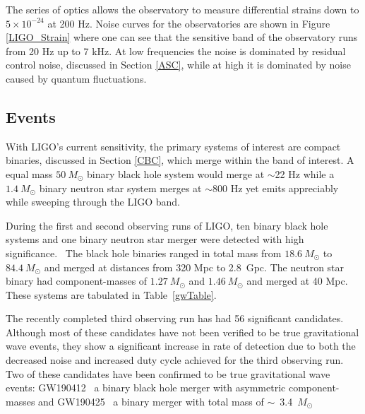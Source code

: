 \documentclass [12pt, proquest]{uwthesis}[2019]
\begin{document}
The series of optics allows the observatory to measure differential strains down to $5\times10^{-24}$ at 200 Hz.  Noise curves for the observatories are shown in Figure \ref{LIGO_Strain} where one can see that the sensitive band of the observatory runs from 20 Hz up to 7 kHz. At low frequencies the noise is dominated by residual control noise, discussed in Section \ref{ASC}, while at high it is dominated by noise caused by quantum fluctuations. ~\cite{Squeeze}



\subsection{Events}

With LIGO's current sensitivity, the primary systems of interest are compact binaries, discussed in Section \ref{CBC}, which merge within the band of interest. A equal mass $50\ M_\odot$ binary black hole system would merge at $\sim$22 Hz while a $1.4\ M_\odot$ binary neutron star system merges at $\sim$800 Hz yet emits appreciably while sweeping through the LIGO band.

During the first and second observing runs of LIGO, ten binary black hole systems and one binary neutron star merger were detected with high significance.~\cite{GWTC} The black hole binaries ranged in total mass from $18.6\ M_\odot$ to $84.4\ M_\odot$ and merged at distances from 320 Mpc to 2.8~Gpc. The neutron star binary had component-masses of $1.27\ M_\odot$ and $1.46\ M_\odot$ and merged at 40 Mpc. These systems are tabulated in Table~\ref{gwTable}.

The recently completed third observing run has had 56 significant candidates.~\cite{O3events} Although most of these candidates have not been verified to be true gravitational wave events, they show a significant increase in rate of detection due to both the decreased noise and increased duty cycle achieved for the third observing run. Two of these candidates have been confirmed to be true gravitational wave events: GW190412~\cite{GW190412} a binary black hole merger with asymmetric component-masses and GW190425~\cite{GW190425} a binary merger with total mass of $\sim$~3.4~$M_\odot$
\end{document}
